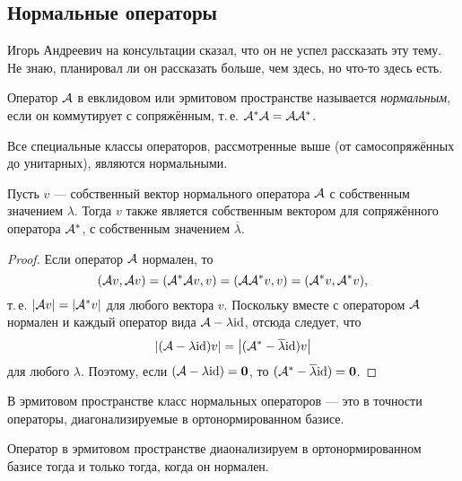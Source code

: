 \subsection{Нормальные операторы}

Игорь Андреевич на консультации сказал, что он не успел рассказать эту тему. Не знаю, планировал ли он рассказать больше, чем здесь, но что-то здесь есть.

\begin{definition}
    Оператор $\mathcal{A}$ в евклидовом или эрмитовом пространстве называется \textit{нормальным}, если он коммутирует с сопряжённым, т.\,е. $\mathcal{A}^\ast\mathcal{A} = \mathcal{A}\mathcal{A}^\ast$.
\end{definition}

Все специальные классы операторов, рассмотренные выше (от самосопряжённых до унитарных), являются нормальными.

\begin{lemma}
    Пусть $v$ --- собственный вектор нормального оператора $\mathcal{A}$ с собственным значением $\lambda$. Тогда $v$ также является собственным вектором для сопряжённого оператора $\mathcal{A}^\ast$, с собственным значением $\overline{\lambda}$.
\end{lemma}

\begin{proof}
    Если оператор $\mathcal{A}$ нормален, то
    \[
        (\mathcal{A} v, \mathcal{A} v) = (\mathcal{A}^\ast\mathcal{A} v, v) = (\mathcal{A}\mathcal{A}^\ast v, v) = (\mathcal{A}^\ast v, \mathcal{A}^\ast v),
    \]
    т.\,е. $\left\lvert\mathcal{A} v\right\rvert = \left\lvert\mathcal{A}^\ast v\right\rvert$ для любого вектора $v$. Поскольку вместе с оператором $\mathcal{A}$ нормален и каждый оператор вида $\mathcal{A} - \lambda\mathrm{id}$, отсюда следует, что
    \[
        \left\lvert(\mathcal{A} - \lambda\mathrm{id})v\right\rvert = \left\lvert(\mathcal{A}^\ast - \overline{\lambda}\mathrm{id})v\right\rvert
    \]
    для любого $\lambda$. Поэтому, если $(\mathcal{A} - \lambda\mathrm{id}) = \boldsymbol{0}$, то $(\mathcal{A}^\ast - \overline{\lambda}\mathrm{id}) = \boldsymbol{0}$.
\end{proof}

В эрмитовом пространстве класс нормальных операторов --- это в точности операторы, диагонализируемые в ортонормированном базисе.

\begin{theorem}
    Оператор в эрмитовом пространстве диаонализируем в ортонормированном базисе тогда и только тогда, когда он нормален.
\end{theorem}


